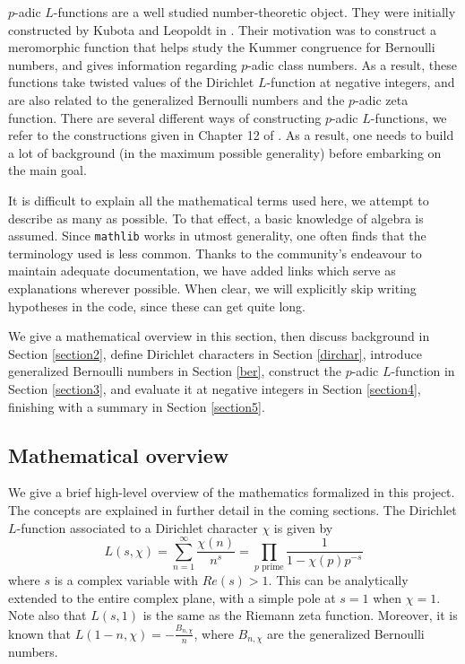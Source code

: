\documentclass[a4paper,UKenglish,cleveref, autoref, thm-restate]{lipics-v2021}
\newcommand{\lean}[1]{\texttt{#1}\xspace} %
\begin{document}
$p$-adic $L$-functions are a well studied number-theoretic object. They were initially constructed 
by Kubota and Leopoldt in \cite{KL}. Their motivation was to construct a meromorphic function that helps study 
the Kummer congruence for Bernoulli numbers, and gives information regarding $p$-adic class numbers. 
As a result, these functions take twisted values of the Dirichlet $L$-function at negative integers, and 
are also related to the generalized Bernoulli numbers and the $p$-adic zeta function. There are several different ways of 
constructing $p$-adic $L$-functions, we refer to the constructions
given in Chapter 12 of \cite{cyc}. As a result, one needs to build a lot of background (in the maximum possible generality) 
before embarking on the main goal.

It is difficult to explain all the mathematical terms used here, we attempt to describe as many as possible. To that effect, 
a basic knowledge of algebra is assumed. Since \lean{mathlib} works in utmost generality, one often finds that the terminology 
used is less common. Thanks to the community's endeavour to maintain adequate documentation, we have added links which serve as 
explanations wherever possible. When clear, we will explicitly skip writing hypotheses in the code, since these can get quite long.

We give a mathematical overview in this section, then discuss background in Section \ref{section2}, define Dirichlet characters in Section \ref{dirchar}, 
introduce generalized Bernoulli numbers in Section \ref{ber}, construct the $p$-adic $L$-function in Section \ref{section3}, and evaluate it at negative integers in Section \ref{section4}, finishing with a summary in Section \ref{section5}. 
\subsection{Mathematical overview}
We give a brief high-level overview of the mathematics formalized in this project. The concepts are explained in further detail in the coming sections.
The Dirichlet $L$-function associated to a Dirichlet character $\chi$ is given by  
$$ L(s, \chi) = \sum_{n = 1}^{\infty} \frac{\chi (n)}{n^s} = \prod_{p \text{ prime}} \frac{1}{1 - \chi (p) p^{-s}}$$
where $s$ is a complex variable with $Re(s) > 1$. This can be analytically extended 
to the entire complex plane, with a simple pole at $s = 1$ when $\chi = 1$. Note also 
that $L(s, 1)$ is the same as the Riemann zeta function. Moreover, it is known that 
$L(1 - n, \chi) = - \frac{B_{n, \chi}}{n}$, where $B_{n, \chi}$ are the generalized 
Bernoulli numbers. 
\end{document}
